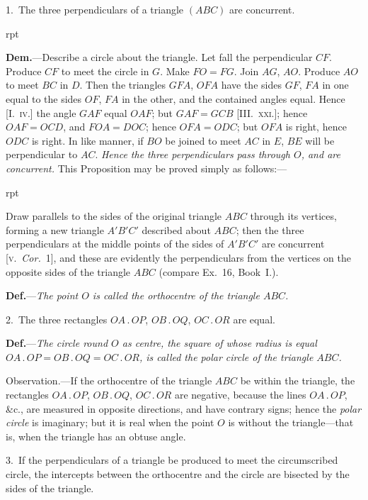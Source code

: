 \documentclass[oneside]{book}
\newcommand\imgflow[3]{
\setcounter{wrapwidth}{#1}
\begin{wrapfigure}[#2]{r}{\value{wrapwidth}pt}
\begin{center}
\vspace{-0.3in}
\end{center}
\end{wrapfigure}
}
\begin{document}
\begin{footnotesize}
1.~The three perpendiculars of a triangle $(ABC)$ are concurrent.

\imgflow{103}{10}{f157}

\textbf{Dem.}---Describe a circle about the triangle. Let fall the perpendicular
$CF$. Produce $CF$ to meet the
circle in $G$. Make $FO = FG$. Join $AG$,
$AO$. Produce $AO$ to meet $BC$ in $D$.
Then the triangles $GFA$, $OFA$ have the
sides $GF$, $FA$ in one equal to the sides
$OF$, $FA$ in the other, and the contained
angles equal. Hence [I.~\textsc{iv}.] the angle
$GAF$ equal $OAF$; but $GAF = GCB$
[III\@.~\textsc{xxi}.]; hence $OAF = OCD$, and $FOA
= DOC$; hence $OFA = ODC$; but $OFA$
is right, hence $ODC$ is right. In like
manner, if $BO$ be joined to meet $AC$ in $E$, $BE$ will be perpendicular
to $AC$. \emph{Hence the three perpendiculars pass through $O$,
and are concurrent.} This Proposition may be proved simply as
follows:---

\imgflow{150}{13}{f158}

Draw parallels to the sides of the original triangle $ABC$ through
its vertices, forming a new triangle
$A'B'C'$ described about
$ABC$; then the three perpendiculars
at the middle points of the
sides of $A'B'C'$ are concurrent [\textsc{v.}~\emph{Cor.}~1],
and these are evidently
the perpendiculars from the vertices
on the opposite sides of the
triangle $ABC$ (compare Ex.~16,
Book~I.).

\textbf{Def.}---\textit{The point $O$ is called the
orthocentre of the triangle $ABC$.}

2.~The three rectangles $OA\,.\,OP$, $OB\,.\,OQ$, $OC\,.\,OR$ are equal.

\textbf{Def.}---\textit{The circle round $O$ as centre, the square of whose radius
is equal $OA\,.\,OP = OB\,.\,OQ = OC\,.\,OR$, is called the polar circle
of the triangle $ABC$.}

\textsf{Observation.}---If the orthocentre of the triangle $ABC$ be
within the triangle, the rectangles $OA\,.\,OP$, $OB\,.\,OQ$, $OC\,.\,OR$ are
negative, because the lines $OA\,.\,OP$, \&c., are measured in opposite
directions, and have contrary signs; hence the \emph{polar circle} is
imaginary; but it is real when the point $O$ is without the triangle---that
is, when the triangle has an obtuse angle.

3.~If the perpendiculars of a triangle be produced to meet the
circumscribed circle, the intercepts between the orthocentre and
the circle are bisected by the sides of the triangle.


\end{footnotesize}
\end{document}

